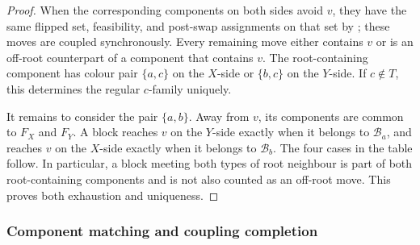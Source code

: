 \begin{proof}
When the corresponding components on both sides avoid \(v\), they have
the same flipped set, feasibility, and post-swap assignments on that set
by ; these moves are coupled synchronously.
Every remaining move either contains \(v\) or is an off-root counterpart
of a component that contains \(v\).  The root-containing component has
colour pair \(\{a,c\}\) on the \(X\)-side or \(\{b,c\}\) on the
\(Y\)-side.  If \(c\notin T\), this determines the regular \(c\)-family
uniquely.

It remains to consider the pair \(\{a,b\}\).  Away from \(v\), its
components are common to \(F_X\) and \(F_Y\).  A block reaches \(v\) on
the \(Y\)-side exactly when it belongs to \(\mathcal B_a\), and reaches
\(v\) on the \(X\)-side exactly when it belongs to \(\mathcal B_b\).
The four cases in the table follow.  In particular, a block meeting both
types of root neighbour is part of both root-containing components and is
not also counted as an off-root move.  This proves both exhaustion and
uniqueness.
\end{proof}

\subsubsection{Component matching and coupling completion}

